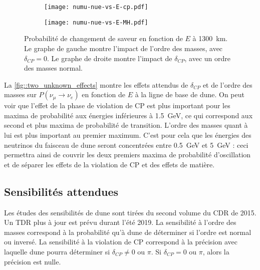         \begin{figure}[htpb]
          \begin{subfigure}[t]{0.49\textwidth}
            \texttt{[image: numu-nue-vs-E-cp.pdf]}
          \end{subfigure}\hfill
          \begin{subfigure}[t]{0.49\textwidth}
            \texttt{[image: numu-nue-vs-E-MH.pdf]}
          \end{subfigure}
            \caption[Probabilité de changement de saveur en fonction de $E$ à \SI{1300}{\kilo\meter}]{\label{fig::two_unknown_effects}Probabilité de changement de saveur en fonction de $E$ à \SI{1300}{\kilo\meter}. Le graphe de gauche montre l'impact de l'ordre des masses, avec $\delta_{CP}=0$. Le graphe de droite montre l'impact de $\delta_{CP}$, avec un ordre des masses normal.}
        \end{figure}
        La \autoref{fig::two_unknown_effects} montre les effets attendus de $\delta_{CP}$ et de l'ordre des masses sur $P(\nu_{\mu}\to\nu_e)$ en fonction de $E$ à la ligne de base de \gls{dune}. On peut voir que l'effet de la phase de violation de CP est plus important pour les maxima de probabilité aux énergies inférieures à \SI{1.5}{\giga\electronvolt}, ce qui correspond aux second et plus maxima de probabilité de transition. L'ordre des masses quant à lui est plus important au premier maximum. C'est pour cela que les énergies des neutrinos du faisceau de \gls{dune} seront concentrées entre  \SI{0.5}{\giga\electronvolt} et \SI{5}{\giga\electronvolt} : ceci permettra ainsi de couvrir les deux premiers maxima de probabilité d'oscillation et de séparer les effets de la violation de CP et des effets de matière.


    \subsection{Sensibilités attendues}\label{sec::sensibility}

        Les études des sensibilités de \gls{dune} sont tirées du second volume du CDR de 2015\cite{Collaboration2015}. Un TDR plus à jour est prévu durant l'été 2019. La sensibilité à l'ordre des masses correspond à la probabilité qu'à \gls{dune} de déterminer si l'ordre est normal ou inversé. La sensibilité à la violation de CP correspond à la précision avec laquelle \gls{dune} pourra déterminer si $\delta_{CP} \neq 0$ ou $\pi$. Si $\delta_{CP} = 0$ ou $\pi$, alors la précision est nulle. %

